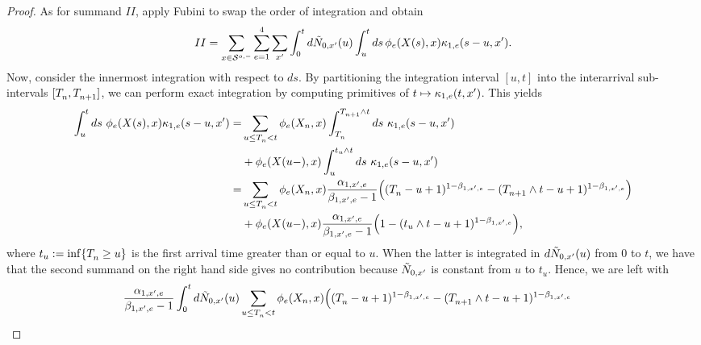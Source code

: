 \documentclass[10pt, article,table]{article}
\begin{document}
\begin{proof}
As for summand $II$, apply Fubini to swap the order of integration and obtain 
\begin{equation*}
 II =
 \sum_{x\in\weakDeflSpace}\sum_{e=1}^{4}\sum_{\xone}
 \intzerot d\hybridHawkes_{0,\xone}(u) 
 \int_{u}^{t}ds \, \transProb_{e}(\stateVariable(s),x)\hawkesKernel_{1,e}(s-u,\xone) .
\end{equation*}
Now, consider the innermost integration with respect to $ds$. By partitioning the integration interval $[u,t]$ into the interarrival sub-intervals $[\arrivalTimes[]_{n}, \arrivalTimes[]_{n+1}]$, we can perform exact integration by computing primitives of $t\mapsto\hawkesKernel_{1,e}(t,\xone)$. This yields
\begin{equation*}
\begin{split}
 \int_{u}^{t} ds \, \, \transProb_{e} (\stateVariable(s),x) \hawkesKernel_{1,e}(s-u,\xone)
 = &
 \sum_{u\leq \arrivalTimes[]_n < t} \transProb_{e} (\stateVariable_n, x)
 \int_{\arrivalTimes[]_n}^{\arrivalTimes[]_{n+1}\wedge t} ds \,\, \hawkesKernel_{1,e}(s-u,\xone)
 \\
 &+
 \transProb_{e} (\stateVariable(u-), x)
 \int_{u}^{t_u \wedge t} ds \,\, \hawkesKernel_{1,e}(s-u,\xone)
 \\
 =&
 \sum_{u\leq \arrivalTimes[]_n < t} \transProb_{e}(\stateVariable_n, x) \frac{\impCoef_{1,\xone,e}}{\decCoef_{1,\xone,e} - 1}
 \Big(
 (\arrivalTimes[]_n - u +1)^{1-\decCoef_{1,\xone,e}}
  - (\arrivalTimes[]_{n+1}\wedge t - u +1)^{1-\decCoef_{1,\xone,e}}  
 \Big)
 \\
 &+
 \transProb_{e}(\stateVariable(u-), x) \frac{\impCoef_{1,\xone,e}}{\decCoef_{1,\xone,e} - 1}
 \Big(
 1  - (t_u\wedge t - u +1)^{1-\decCoef_{1,\xone,e}}
 \Big),
 \end{split}
\end{equation*}
where $t_u:= \inf\lbrace \arrivalTimes[]_n \geq u\rbrace$ is the first arrival time greater than or equal to $u$. When the latter is integrated in $d\hybridHawkes_{0,\xone}(u)$ from $0$ to $t$, we have that the second summand on the right hand side gives no contribution because $\hybridHawkes_{0,\xone}$ is constant from $u$ to $t_u$. Hence, we are left with 
\begin{equation*}
\begin{split}
 \frac{\impCoef_{1,\xone,e}}{\decCoef_{1,\xone,e} - 1}
 \intzerot d\hybridHawkes_{0,\xone}(u)
 &
 \sum_{u\leq \arrivalTimes[]_n < t} \transProb_{e}(\stateVariable_n, x) 
 \Big(
 (\arrivalTimes[]_n - u +1)^{1-\decCoef_{1,\xone,e}}
  - (\arrivalTimes[]_{n+1}\wedge t - u +1)^{1-\decCoef_{1,\xone,e}}  

\end{split}
\end{equation*}
\end{proof}
\end{document}
